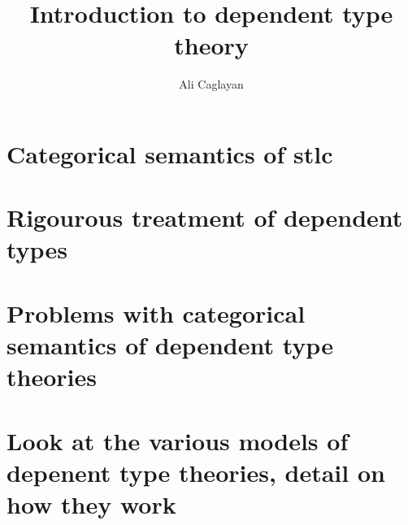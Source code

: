 \documentclass{article}
\title{Introduction to dependent type theory}
\author{Ali Caglayan}
\theoremstyle{definition}
\begin{document}
\maketitle

\tableofcontents













\section{Categorical semantics of stlc}

\section{Rigourous treatment of dependent types}

\section{Problems with categorical semantics of dependent type theories}

\section{Look at the various models of depenent type theories, detail on how they work}



%

 

\end{document}
